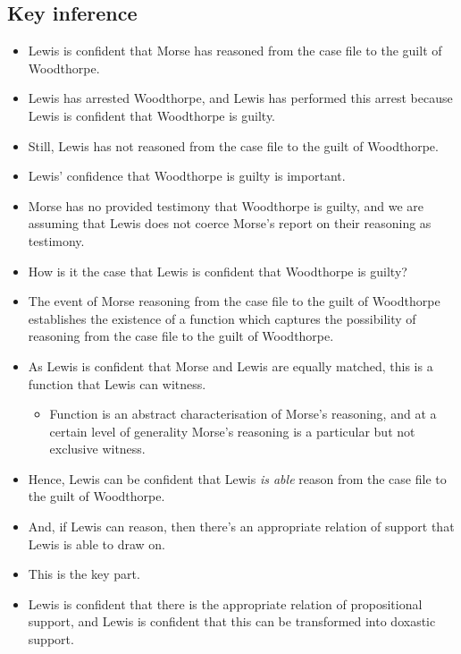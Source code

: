 \documentclass[10pt]{article}
\newcommand{\hozlinedash}[0]{%
  \noindent\hdashrule[0.5ex][c]{\textwidth}{.1pt}{2.5pt}
}
\begin{document}
\hozlinedash

\subsection{Key inference}
\label{sec:key-inference}

\begin{itemize}
\item Lewis is confident that Morse has reasoned from the case file to the guilt of Woodthorpe.
\item Lewis has arrested Woodthorpe, and Lewis has performed this arrest because Lewis is confident that Woodthorpe is guilty.
\item Still, Lewis has not reasoned from the case file to the guilt of Woodthorpe.
\end{itemize}

\begin{itemize}
\item Lewis' confidence that Woodthorpe is guilty is important.
\item Morse has no provided testimony that Woodthorpe is guilty, and we are assuming that Lewis does not coerce Morse's report on their reasoning as testimony.
\end{itemize}

\begin{itemize}
\item How is it the case that Lewis is confident that Woodthorpe is guilty?
\end{itemize}

\begin{itemize}
\item The event of Morse reasoning from the case file to the guilt of Woodthorpe establishes the existence of a function which captures the possibility of reasoning from the case file to the guilt of Woodthorpe.
\item As Lewis is confident that Morse and Lewis are equally matched, this is a function that Lewis can witness.
  \begin{itemize}
  \item Function is an abstract characterisation of Morse's reasoning, and at a certain level of generality Morse's reasoning is a particular but not exclusive witness.
  \end{itemize}
\item Hence, Lewis can be confident that Lewis \emph{is able} reason from the case file to the guilt of Woodthorpe.
\item And, if Lewis can reason, then there's an appropriate relation of support that Lewis is able to draw on.
\item This is the key part.
\item Lewis is confident that there is the appropriate relation of propositional support, and Lewis is confident that this can be transformed into doxastic support.
\end{itemize}
\end{document}
